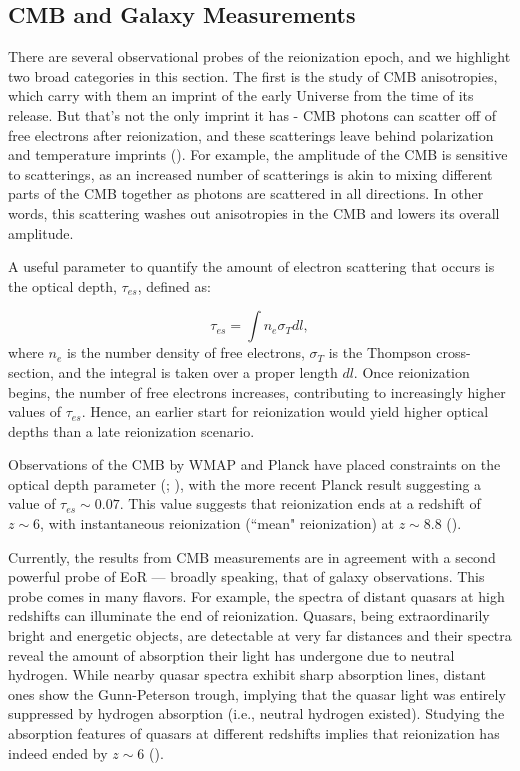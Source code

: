 \subsection{CMB and Galaxy Measurements}

There are several observational probes of the reionization epoch, and we highlight two broad categories in this section. The first is the study of CMB anisotropies, which carry with them an imprint of the early Universe from the time of its release. But that's not the only imprint it has - CMB photons can scatter off of free electrons after reionization, and these scatterings leave behind polarization and temperature imprints (\citealt{haiman_knox_1999}). For example, the amplitude of the CMB is sensitive to scatterings, as an increased number of scatterings is akin to mixing different parts of the CMB together as photons are scattered in all directions. In other words, this scattering washes out anisotropies in the CMB and lowers its overall amplitude. 

A useful parameter to quantify the amount of electron scattering that occurs is the optical depth, $\tau_{es}$, defined as:

\begin{equation}
\tau_{es} = \int n_{e}\sigma_{T} dl,
\end{equation}
where $n_{e}$ is the number density of free electrons, $\sigma_{T}$ is the Thompson cross-section, and the integral is taken over a proper length $dl$. Once reionization begins, the number of free electrons increases, contributing to increasingly higher values of $\tau_{es}$. Hence, an earlier start for reionization would yield higher optical depths than a late reionization scenario. 

Observations of the CMB by WMAP and Planck have placed constraints on the optical depth parameter (\citealt{hinshaw_et_al2013}; \citealt{planck2016}), with the more recent Planck result suggesting a value of $\tau_{es} \sim 0.07$. This value suggests that reionization ends at a redshift of $z \sim 6$, with instantaneous reionization (``mean" reionization) at $z \sim 8.8$ (\citealt{planck2016}).

Currently, the results from CMB measurements are in agreement with a second powerful probe of EoR --- broadly speaking, that of galaxy observations. This probe comes in many flavors. For example, the spectra of distant quasars at high redshifts can illuminate the end of reionization. Quasars, being extraordinarily bright and energetic objects, are detectable at very far distances and their spectra reveal the amount of absorption their light has undergone due to neutral hydrogen. While nearby quasar spectra exhibit sharp absorption lines, distant ones show the Gunn-Peterson trough, implying that the quasar light was entirely suppressed by hydrogen absorption (i.e., neutral hydrogen existed). Studying the absorption features of quasars at different redshifts implies that reionization has indeed ended by $z \sim 6$ (\citealt{becker_et_al2001}). 

